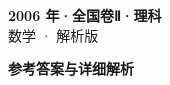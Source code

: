 \documentclass[zihao=-4, a4paper]{ctexart}
\begin{document}
\begin{center}
  {\Large\bfseries 2006 年·全国卷Ⅱ·理科}\\[4pt]
  {\large 数学 · 解析版}
\end{center}
\medskip
{}

\clearpage
{}
\begin{center}{\Large\bfseries 参考答案与详细解析}\end{center}
\medskip

\end{document}
